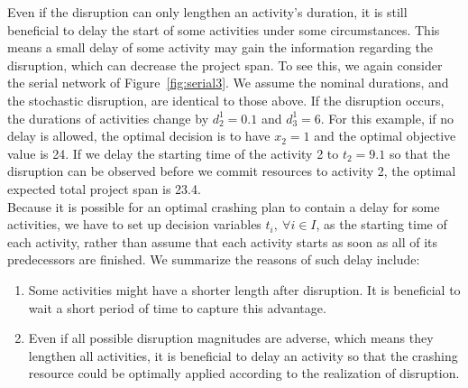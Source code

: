 \documentclass[11pt]{article}
\begin{document}
	\newline
	Even if the disruption can only lengthen an activity's duration, it is still beneficial to delay the start of some activities under some circumstances. This means a small delay of some activity may gain the information regarding the disruption, which can decrease the project span. To see this, we again consider the serial network of Figure~\ref{fig:serial3}. We assume the nominal durations, and the stochastic disruption, are identical to those above. If the disruption occurs, the durations of activities change by \(d_2^1=0.1\) and \(d_3^1 = 6\). For this example, if no delay is allowed, the optimal decision is to have \(x_2 = 1\) and the optimal objective value is 24. If we delay the starting time of the activity 2 to \(t_2 = 9.1\) so that the disruption can be observed before we commit resources to activity 2, the optimal expected total project span is 23.4. \\
	\newline
	Because it is possible for an optimal crashing plan to contain a delay for some activities, we have to set up decision variables \(t_i,\ \forall i \in I\), as the starting time of each activity, rather than assume that each activity starts as soon as all of its predecessors are finished.  We summarize the reasons of such delay include:
		\begin{enumerate}
			\item Some activities might have a shorter length after disruption. It is beneficial to wait a short period of time to capture this advantage.
			\item Even if all possible disruption magnitudes are adverse, which means they lengthen all activities, it is beneficial to delay an activity so that the crashing resource could be optimally applied according to the realization of disruption.
		\end{enumerate}
	
\end{document}

